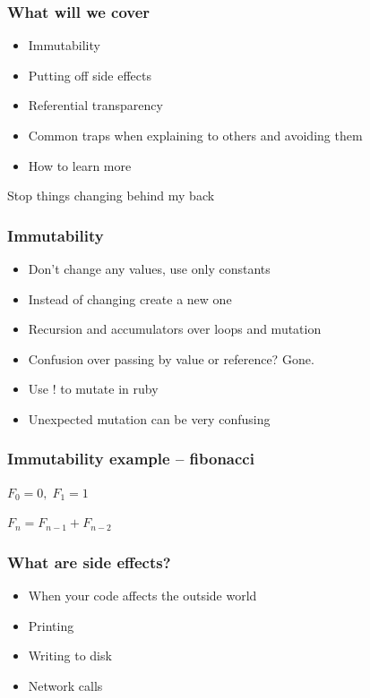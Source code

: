 \documentclass{beamer}
\begin{document}
\begin{frame}
  \frametitle{What will we cover}
  \begin{itemize}
    \item Immutability
    \item Putting off side effects
    \item Referential transparency
    \item Common traps when explaining to others and avoiding them
    \item How to learn more
  \end{itemize}
\end{frame}

\begin{frame}
  \begin{center}
    \Huge Stop things changing behind my back
  \end{center}
\end{frame}

\begin{frame}
  \frametitle{Immutability}
  \begin{itemize}
    \item Don't change any values, use only constants
    \item Instead of changing create a new one
    \item Recursion and accumulators over loops and mutation
    \item Confusion over passing by value or reference? Gone.
    \item Use ! to mutate in ruby
    \item Unexpected mutation can be very confusing
  \end{itemize}
\end{frame}

\begin{frame}
  \frametitle{Immutability example -- fibonacci}
  $ F_0 = 0,\; F_1 = 1$

  $F_n = F_{n-1} + F_{n-2}$
\end{frame}

\begin{frame}
  \frametitle{What are side effects?}
  \begin{itemize}
    \item When your code affects the outside world
    \item Printing
    \item Writing to disk
    \item Network calls
  \end{itemize}
\end{frame}
\end{document}
